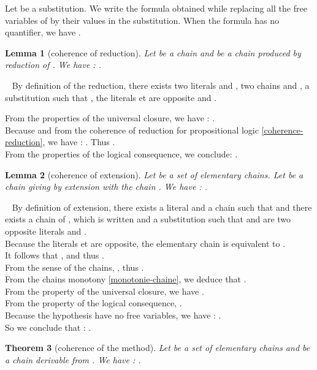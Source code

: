 \documentclass{article}
\newtheorem{theoreme}{Theorem}\newtheorem{lemme}[theoreme]{Lemma}
\newenvironment{preuve}{\noindent {\em Proof :}\ }{{\hfill
    }\vspace{.5pc}} \newcommand{\sg}{\!\!<\!\!}
\begin{document}
Let  be a substitution. We write  the formula obtained while replacing all the free variables of 
by their values in the substitution. When the formula  has no quantifier, we have  .

\begin{lemme}[coherence of reduction]\label{coherence-reduction-1}
Let  be a chain and  be a chain produced by reduction of .
We have : .
\end{lemme}

\begin{preuve}
By definition of the reduction, there exists two literals  and , two chains  and , a substitution 
such that 
 , the literals   et  are opposite  and
.

From the properties of the universal closure, we have : .\\
Because  and
from the coherence of reduction for propositional logic \ref{coherence-reduction}, 
 we have : .
Thus . \\
From the properties of the logical consequence, we conclude: .
\end{preuve}



\begin{lemme}[coherence of extension]\label{coherence-expansion-1}
Let  be a set of elementary chains. Let  be a chain giving by extension with  the chain .
We have : .
\end{lemme}

\begin{preuve}
By definition of extension, there exists a literal  and a chain  such that  and there exists a chain of , 
which is written  and a substitution  such that  and  are two opposite literals and
 .\\
Because the literals   et  are opposite, the elementary chain  is equivalent to
 .\\
It follows that , and thus
.\\
From the sense of the chains, , thus 
.\\ 
From the chains monotony \ref{monotonie-chaine}, we deduce that .\\
From the property of the universal closure, we have .\\
From the property of the logical consequence, .\\
Because the hypothesis have no free variables, we have : .\\
So we conclude that :  .
\end{preuve}


\begin{theoreme}[coherence of the method]
Let  be a set of elementary chains and  be a chain derivable from .
We have : .
\end{theoreme}
\end{document}
